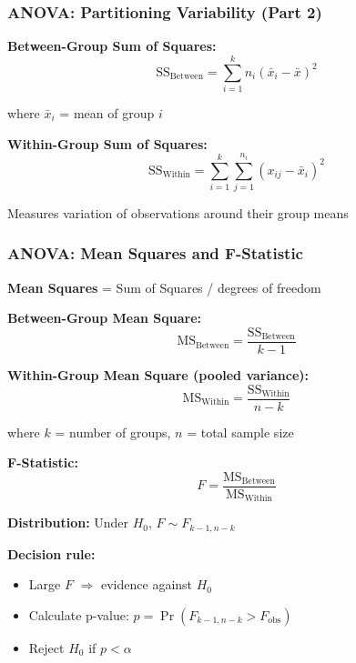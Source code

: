 \documentclass{beamer}
\begin{document}
\begin{frame}
\frametitle{ANOVA: Partitioning Variability (Part 2)}
\textbf{Between-Group Sum of Squares:}
$$\text{SS}_{\text{Between}} = \sum_{i=1}^{k} n_i (\bar{x}_i - \bar{x})^2$$

where $\bar{x}_i$ = mean of group $i$

\vspace{0.3cm}
\textbf{Within-Group Sum of Squares:}
$$\text{SS}_{\text{Within}} = \sum_{i=1}^{k}\sum_{j=1}^{n_i} (x_{ij} - \bar{x}_i)^2$$

Measures variation of observations around their group means
\end{frame}

\begin{frame}
\frametitle{ANOVA: Mean Squares and F-Statistic}
\textbf{Mean Squares} = Sum of Squares / degrees of freedom

\vspace{0.1cm}
\textbf{Between-Group Mean Square:}
$$\text{MS}_{\text{Between}} = \frac{\text{SS}_{\text{Between}}}{k-1}$$

\textbf{Within-Group Mean Square (pooled variance):}
$$\text{MS}_{\text{Within}} = \frac{\text{SS}_{\text{Within}}}{n-k}$$

\small where $k$ = number of groups, $n$ = total sample size

\vspace{0.1cm}
\textbf{F-Statistic:}
$$F = \frac{\text{MS}_{\text{Between}}}{\text{MS}_{\text{Within}}}$$

\vspace{0.1cm}
\textbf{Distribution:} Under $H_0$, $F \sim F_{k-1, n-k}$

\vspace{0.1cm}
\textbf{Decision rule:}
\begin{itemize}
\setlength\itemsep{-0.2em}
\item Large $F$ $\Rightarrow$ evidence against $H_0$
\item Calculate p-value: $p = \Pr(F_{k-1,n-k} > F_{\text{obs}})$
\item Reject $H_0$ if $p < \alpha$
\end{itemize}
\end{frame}
\end{document}
